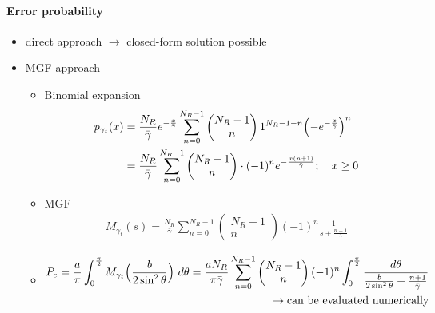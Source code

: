 \documentclass[a4paper, 10pt]{article}
\begin{document}
\paragraph*{Error probability}
	\begin{itemize}
		\item direct approach $\rightarrow$ closed-form solution possible
		\item MGF approach
		\begin{itemize}
			\item Binomial expansion\\
			\begin{align*}
				p_{\gamma _t}(x) &= \frac{N_R}{\bar{\gamma}}e^{-\frac{x}{\bar{\gamma}}}\sum_{n = 0}^{N_R - 1}\begin{pmatrix} N_R - 1 \\ n\end{pmatrix} 1^{N_R - 1 - n}\Bigl( -e^{-\frac{x}{\bar{\gamma}}}\Bigr)^n \\
				&= \frac{N_R}{\bar{\gamma}}\sum_{n = 0}^{N_R - 1}\begin{pmatrix}N_R - 1 \\ n\end{pmatrix}\cdot (-1)^{n}e^{-\frac{x(n + 1)}{\bar{\gamma}}};\quad	x \geq 0
			\end{align*}
			\item MGF\\
			\begin{align*}
				M_{\gamma _t}(s) = \frac{N_R}{\bar{\gamma}}\sum_{n = 0}^{N_R - 1}\begin{pmatrix}N_R - 1\\n\end{pmatrix}(-1)^{n}\frac{1}{s + \frac{n+1}{\bar{\gamma}}}
			\end{align*}
			\item 
			\begin{align*}
				P_e = \frac{a}{\pi}\int_{0}^{\frac{\pi}{2}}M_{\gamma _t}\Bigl(\frac{b}{2\sin^2\theta}\Bigr)~d\theta = \frac{aN_R}{\pi\bar{\gamma}}\sum_{n = 0}^{N_R - 1}\begin{pmatrix}N_R - 1\\ n\end{pmatrix} (-1)^{n}\int_{0}^{\frac{\pi}{2}}\frac{d\theta}{\frac{b}{2\sin^2\theta} + \frac{n + 1}{\bar{\gamma}}}\\ \rightarrow\text{can be evaluated numerically}				
			\end{align*}
		\end{itemize}
	\end{itemize}
\end{document}
